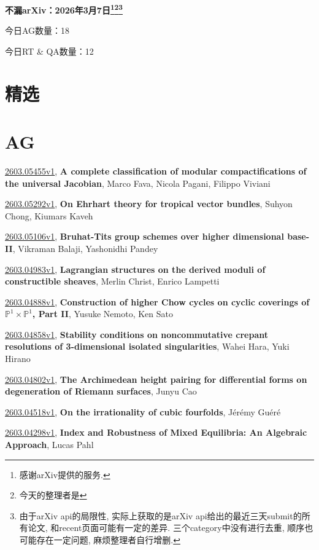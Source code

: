 \documentclass[9pt, a4paper]{article}
\theoremstyle{plain}
\theoremstyle{definition}
\theoremstyle{remark}
\newcommand{\arxiv}[3]{\href{https://arxiv.org/abs/#1}{#1}, \textbf{\textcolor{arxivblue}{#2}}, #3}
\newcommand{\AGnumber}{18}
\newcommand{\RTQAnumber}{12}
\newcommand{\NewestDate}{2026年3月7日}
\newcommand{\todayarXiver}{} %
\begin{document}
\begin{center}
    \Huge\textbf{不漏arXiv：\NewestDate\footnote{感谢arXiv提供的服务.}\footnote{今天的整理者是\todayarXiver}\footnote{由于arXiv api的局限性, 实际上获取的是arXiv api给出的最近三天submit的所有论文, 和recent页面可能有一定的差异. 三个category中没有进行去重, 顺序也可能存在一定问题, 麻烦整理者自行增删.}} \\
\end{center}

\setcounter{section}{-1}

\begin{center}
    今日AG数量：\AGnumber
    
    今日RT \& QA数量：\RTQAnumber
    
\end{center}


\section{精选}


\section{AG}
\arxiv{2603.05455v1}{A complete classification of modular compactifications of the universal Jacobian}{Marco Fava, Nicola Pagani, Filippo Viviani}

\arxiv{2603.05292v1}{On Ehrhart theory for tropical vector bundles}{Suhyon Chong, Kiumars Kaveh}

\arxiv{2603.05106v1}{Bruhat-Tits group schemes over higher dimensional base-II}{Vikraman Balaji, Yashonidhi Pandey}

\arxiv{2603.04983v1}{Lagrangian structures on the derived moduli of constructible sheaves}{Merlin Christ, Enrico Lampetti}

\arxiv{2603.04888v1}{Construction of higher Chow cycles on cyclic coverings of $\mathbb{P}^1 \times \mathbb{P}^1$, Part II}{Yusuke Nemoto, Ken Sato}

\arxiv{2603.04858v1}{Stability conditions on noncommutative crepant resolutions of 3-dimensional isolated singularities}{Wahei Hara, Yuki Hirano}

\arxiv{2603.04802v1}{The Archimedean height pairing for differential forms on degeneration of Riemann surfaces}{Junyu Cao}

\arxiv{2603.04518v1}{On the irrationality of cubic fourfolds}{Jérémy Guéré}

\arxiv{2603.04298v1}{Index and Robustness of Mixed Equilibria: An Algebraic Approach}{Lucas Pahl}
\end{document}
